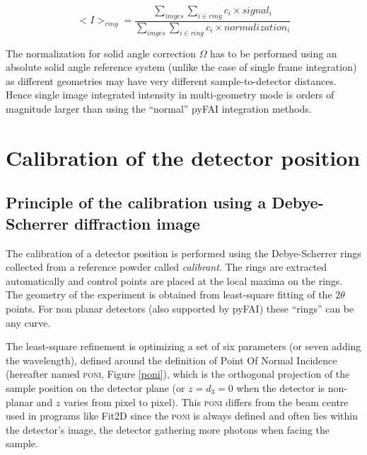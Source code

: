 \documentclass[preprint]{iucr}              %
\begin{document}
\begin{equation}
<I>_{ring} = \frac{\sum\limits_{imges} \sum\limits_{i \in ring} c_i \times
signal_i} {\sum\limits_{imges} \sum\limits_{i \in ring} c_i \times
normalization_i} 
\end{equation}

The normalization for solid angle correction $\Omega$ has to be performed
using an absolute solid angle reference system (unlike the case of single
frame integration) as different geometries may have very different
sample-to-detector distances.
Hence single image integrated intensity in multi-geometry mode is orders of
magnitude larger than using the ``normal'' pyFAI integration methods.

\section{Calibration of the detector position}

\subsection{Principle of the calibration using a Debye-Scherrer diffraction
image}
The calibration of a detector position is performed using the Debye-Scherrer
rings collected from a reference powder called \textit{calibrant}.
The rings are extracted automatically and control points are placed at the
local maxima on the rings.
The geometry of the experiment is obtained from least-square fitting of
the $2\theta$ points.
For non planar detectors (also supported by pyFAI) these ``rings'' can
be any curve.

The least-square refinement is optimizing a set of six parameters
(or seven adding the wavelength), defined around the  definition of Point
Of Normal Incidence (hereafter named \textsc{poni}, Figure \ref{poni}), which is
the orthogonal projection  of the sample position on the detector plane (or
$z=d_3=0$ when the detector is non-planar and $z$ varies from pixel to pixel).
This \textsc{poni} differs from the beam centre used in programs like
Fit2D \cite{Hammersley:fs5107} since the \textsc{poni} is always defined and often lies
within the detector's image, the detector gathering more photons 
when facing the sample.
\end{document}
